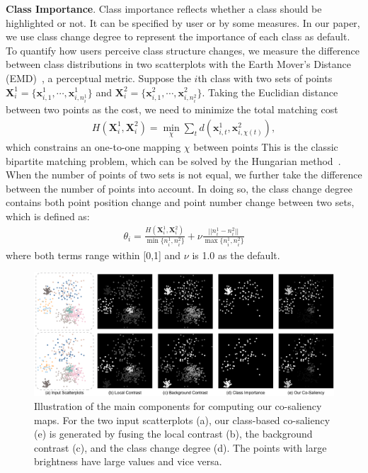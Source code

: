 \vspace{1.5mm}
\noindent\textbf{Class Importance}.
Class importance reflects whether a class should be highlighted or not. It can be specified by user or by some measures. In our paper, we use class change degree to represent the importance of each class as default.
To quantify how users perceive class structure changes, we measure the difference between class distributions in two scatterplots with the Earth Mover's Distance (EMD)~\cite{rubner2000earth}, a perceptual metric.
Suppose the $i$th  class with two sets of points $\mathbf{X}^1_i = \{\mathbf{x}_{i,1}^1, \cdots , \mathbf{x}_{i,n^1_i}^1\}$ and $\mathbf{X}^2_i = \{\mathbf{x}_{i,1}^2, \cdots , \mathbf{x}_{i,n^2_i}^2\}$.
Taking the Euclidian distance between two points as the cost, we need to  minimize the total matching cost
\begin{align}
 H(\mathbf{X}^1_i, \mathbf{X}^2_i)  = \min_\chi \sum_t d(\mathbf{x}_{i,t}^1, \mathbf{x}_{i,\chi(t)}^2), \nonumber
\end{align}
which constrains an one-to-one mapping $\chi$ between points %
This is the classic bipartite matching problem, which can be solved by the Hungarian method~\cite{kuhn1955hungarian}.
When the number of points of two sets is not equal, we further take the difference between the number of points into account. In doing so, the class change degree contains both point position change and point number change between two sets, which is defined as:
\begin{align}\label{eq:cm}
 \theta_i= \frac{H(\mathbf{X}^1_i, \mathbf{X}^2_i) }{\min\{n^1_i, n^2_i\}} + \nu \frac{||n^1_i- n^2_i||}{\max\{n^1_i, n^2_i\}}
\end{align}
where both terms range within [0,1] and $\nu$ is 1.0 as the default.


\begin{figure}[!tb]
\centering
\includegraphics[width=\linewidth]{figures/saliencymap}
\caption{Illustration of the main components for computing our co-saliency maps. For the two input scatterplots (a), our class-based co-saliency (e) is generated by fusing the local contrast (b), the background contrast (c),  and the class change degree (d). The points with large brightness have large values and vice versa.}
\vspace*{-3mm}
\label{fig:map}
\end{figure}
\vspace{1.5mm}

